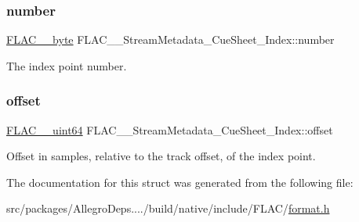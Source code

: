 \subsubsection{\texorpdfstring{number}{number}}
{\footnotesize\ttfamily \hyperlink{ordinals_8h_a5eb569b12d5b047cdacada4d57924ee3}{F\+L\+A\+C\+\_\+\+\_\+byte} F\+L\+A\+C\+\_\+\+\_\+\+Stream\+Metadata\+\_\+\+Cue\+Sheet\+\_\+\+Index\+::number}

The index point number. \mbox{\label{struct_f_l_a_c_____stream_metadata___cue_sheet___index_ac221421bca83976925e2a41438157bb9}} 
\subsubsection{\texorpdfstring{offset}{offset}}
{\footnotesize\ttfamily \hyperlink{ordinals_8h_aa78c8c70a3eb8a58af7436f278acde8e}{F\+L\+A\+C\+\_\+\+\_\+uint64} F\+L\+A\+C\+\_\+\+\_\+\+Stream\+Metadata\+\_\+\+Cue\+Sheet\+\_\+\+Index\+::offset}

Offset in samples, relative to the track offset, of the index point. 

The documentation for this struct was generated from the following file\+:\begin{DoxyCompactItemize}
\item 
src/packages/\+Allegro\+Deps..../build/native/include/\+F\+L\+A\+C/\hyperlink{format_8h}{format.\+h}\end{DoxyCompactItemize}
